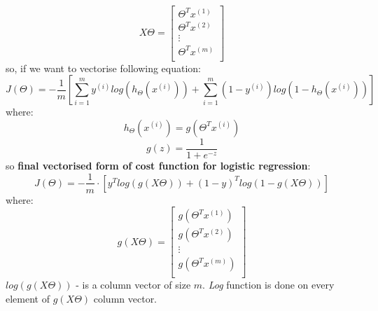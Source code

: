 \documentclass{article} %
\begin{document}
\begin{equation*}
X \Theta = 
\begin{bmatrix} 
\Theta^Tx^{(1)} \\ 
\Theta^Tx^{(2)} \\
\vdots \\
\Theta^Tx^{(m)}\\
\end{bmatrix}  
\end{equation*}
so, if we want to vectorise following equation:
\begin{equation}
J(\Theta) = - \frac{1}{m}
\left[
\sum_{i=1}^{m}y^{(i)}log(h_{\Theta}(x^{(i)}))+
\sum_{i=1}^{m}(1-y^{(i)})log(1-h_{\Theta}(x^{(i)})) 
\right]
\end{equation}
where:
\begin{equation*}
h_{\Theta}(x^{(i)}) = g(\Theta^Tx^{(i)})
\end{equation*}
\begin{equation*} 
g(z) = \frac{1}{1 + e^{-z}}  
\end{equation*}
\newline
so \textbf{final vectorised form of cost function for logistic regression}:
\color{red}
\begin{equation}
J(\Theta) = - \frac{1}{m}\cdot
\left[y^Tlog(g(X\Theta))+(1-y)^Tlog(1-g(X\Theta))\right]
\end{equation} 
\color{black}
where:
\begin{equation*} 
g(X\Theta) = 
\begin{bmatrix} 
g(\Theta^Tx^{(1)}) \\ 
g(\Theta^Tx^{(2)}) \\
\vdots \\
g(\Theta^Tx^{(m)})\\
\end{bmatrix}
\end{equation*} 
$log(g(X\Theta))$ - is a column vector of size $m$. \textit{Log} function is done on every element of $g(X\Theta)$ column vector.  
\end{document}
